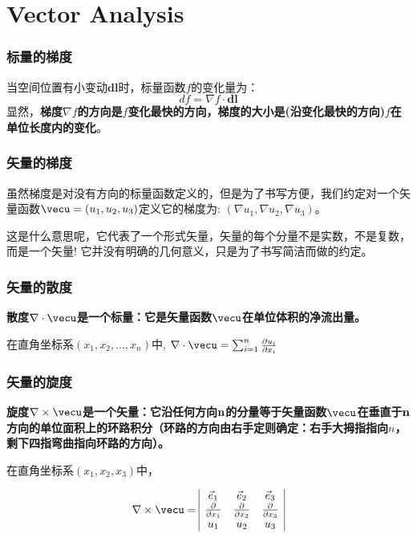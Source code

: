\documentclass[CJK]{beamer}
\begin{document}
\section{Vector Analysis}

\begin{frame}
  \frametitle{标量的梯度}
  当空间位置有小变动$\mathbf{dl}$时，标量函数$f$的变化量为：
  $$df = \nabla f \cdot \mathbf{dl} $$
  显然，{\bf 梯度$\nabla f$的方向是$f$变化最快的方向，梯度的大小是(沿变化最快的方向)$f$在单位长度内的变化}。 
\end{frame}

\begin{frame}
  \frametitle{矢量的梯度}
  虽然梯度是对没有方向的标量函数定义的，但是为了书写方便，我们约定对一个矢量函数$\vecu = (u_1, u_2, u_3)$定义它的梯度为: $(\nabla u_1, \nabla u_2, \nabla u_3)$。

  \skipline
  
  这是什么意思呢，它代表了一个形式矢量，矢量的每个分量不是实数，不是复数，而是一个矢量! 它并没有明确的几何意义，只是为了书写简洁而做的约定。
\end{frame}


\begin{frame}
  \frametitle{矢量的散度}
 {\bf 散度$\nabla \cdot \vecu$是一个标量：它是矢量函数$\vecu$在单位体积的净流出量。}

 \skiplines
 
在直角坐标系$(x_1,x_2,\ldots, x_n)$中, $\nabla \cdot \vecu =\sum_{i=1}^n\frac{\partial u_i}{\partial x_i}$ 
\end{frame}

\begin{frame}
  \frametitle{矢量的旋度}
  {\bf 旋度$\nabla \times \vecu$是一个矢量：它沿任何方向${\mathbf{n}}$的分量等于矢量函数$\vecu$在垂直于${\mathbf{n}}$方向的单位面积上的环路积分（环路的方向由右手定则确定：右手大拇指指向$n$，剩下四指弯曲指向环路的方向）。}             


  在直角坐标系$(x_1,x_2,x_3)$中，

  $$ \nabla \times \vecu =
  \begin{array}{|ccc|}
    \vec{e}_1 & \vec{e}_2 & \vec{e}_3 \\
    \frac{\partial}{\partial x_1} & \frac{\partial}{\partial x_2} & \frac{\partial}{\partial x_3} \\
    u_1 & u_2 & u_3    
  \end{array}
  $$

\end{frame}
\end{document}
